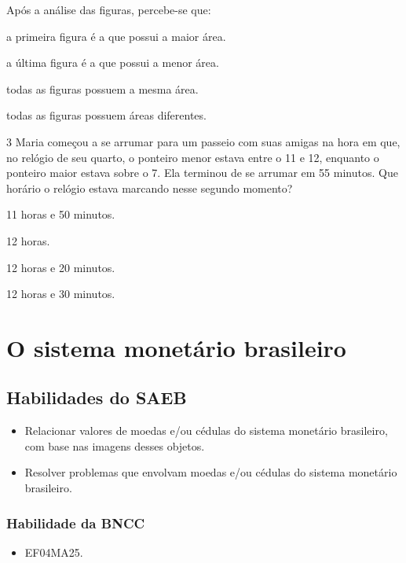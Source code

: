 Após a análise das figuras, percebe-se que:

\begin{escolha}
\item
  a primeira figura é a que possui a maior área.
\item
  a última figura é a que possui a menor área.
\item
  todas as figuras possuem a mesma área.
\item
  todas as figuras possuem áreas diferentes.
\end{escolha}

\num{3} Maria começou a se arrumar para um passeio com suas amigas na hora em
que, no relógio de seu quarto, o ponteiro menor estava entre o 11 e 12, enquanto o ponteiro maior estava sobre o 7. Ela terminou de se arrumar em 55 minutos. Que horário
o relógio estava marcando nesse segundo momento?

\begin{escolha}
\item
  11 horas e 50 minutos.
\item
  12 horas.
\item
  12 horas e 20 minutos.
\item
  12 horas e 30 minutos.
\end{escolha}


\chapter{O sistema monetário brasileiro}

\section{Habilidades do SAEB}

\begin{itemize}
\item Relacionar valores de moedas e/ou cédulas do sistema monetário
brasileiro, com base nas imagens desses objetos.

\item Resolver problemas que envolvam moedas e/ou cédulas do sistema
monetário brasileiro.
\end{itemize}

\subsection{Habilidade da BNCC}

\begin{itemize}
  \item EF04MA25.
\end{itemize}

